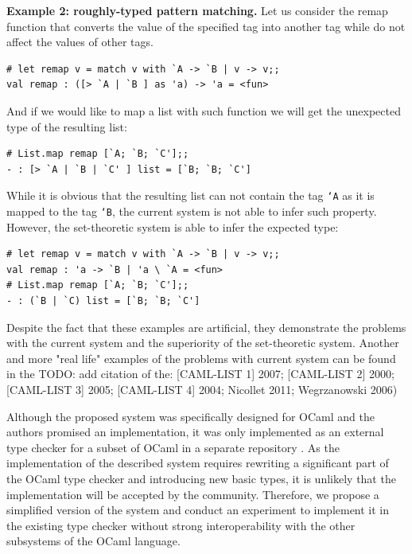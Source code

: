 \documentclass[a4paper,11pt,oneside]{article}
\theoremstyle{definition}
\begin{document}
\textbf{Example 2: roughly-typed pattern matching.} Let us consider the remap function that converts the value of the specified tag into another tag while do not affect the values of other tags.

  {\ttfamily\begin{verbatim}
# let remap v = match v with `A -> `B | v -> v;;
val remap : ([> `A | `B ] as 'a) -> 'a = <fun>
\end{verbatim}}

And if we would like to map a list with such function we will get the unexpected type of the resulting list:

{\ttfamily\begin{verbatim}
# List.map remap [`A; `B; `C'];;
- : [> `A | `B | `C' ] list = [`B; `B; `C']
\end{verbatim}}

While it is obvious that the resulting list can not contain the tag \texttt{`A} as it is mapped to the tag \texttt{`B}, the current system is not able to infer such property. However, the set-theoretic system is able to infer the expected type:

{\ttfamily\begin{verbatim}
# let remap v = match v with `A -> `B | v -> v;;
val remap : 'a -> `B | 'a \ `A = <fun>
# List.map remap [`A; `B; `C'];;
- : (`B | `C) list = [`B; `B; `C']
\end{verbatim}}

Despite the fact that these examples are artificial, they demonstrate the problems with the current system and the superiority of the set-theoretic system. Another and more "real life" examples of the problems with current system can be found in the TODO: add citation of the: [CAML-LIST 1] 2007; [CAML-LIST 2] 2000; [CAML-LIST 3] 2005; [CAML-LIST 4] 2004; Nicollet 2011; Wegrzanowski 2006)

Although the proposed system was specifically designed for OCaml and the authors promised an implementation, it was only implemented as an external type checker for a subset of OCaml in a separate repository \cite{setvariants}.
As the implementation of the described system requires rewriting a significant part of the OCaml type checker and introducing new basic types, it is unlikely that the implementation will be accepted by the community.
Therefore, we propose a simplified version of the system and conduct an experiment to implement it in the existing type checker without strong interoperability with the other subsystems of the OCaml language.
\end{document}
